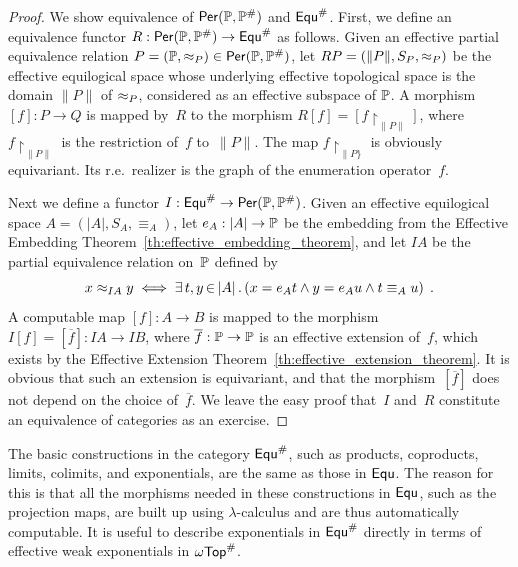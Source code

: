 \begin{proof}
  We show equivalence of $\mathsf{Per}(\mathbb{P}, \mathbb{P}^{\#})$ and
  $\mathsf{Equ}^{\#}$. First, we define an equivalence functor $R: \mathsf{Per}(\mathbb{P},\mathbb{P}^{\#})
  \to \mathsf{Equ}^{\#}$ as follows. Given an effective partial equivalence
  relation $P = (\mathbb{P}, \approx_P) \in \mathsf{Per}(\mathbb{P},\mathbb{P}^{\#})$, let $R P = (\|P\|,
  S_P, \approx_P)$ be the effective equilogical space whose underlying
  effective topological space is the domain $\|P\|$ of $\approx_P$,
  considered as an effective subspace of $\mathbb{P}$. A morphism $[f]: P
  \to Q$ is mapped by~$R$ to the morphism $R[f] =
  [f\restriction_{\|P\|}]$, where $f\restriction_{\|P\|}$ is the
  restriction of~$f$ to~$\|P\|$. The map $f\restriction_{\|P\}}$ is
  obviously equivariant. Its r.e.~realizer is the graph of the
  enumeration operator~$f$.
  
  Next we define a functor $I: \mathsf{Equ}^{\#} \to \mathsf{Per}(\mathbb{P},\mathbb{P}^{\#})$. Given an
  effective equilogical space $A = (|A|, S_A, \equiv_A)$, let $e_A:
  |A| \to \mathbb{P}$ be the embedding from the Effective Embedding
  Theorem~\ref{th:effective_embedding_theorem}, and let $I A$ be the
  partial equivalence relation on~$\mathbb{P}$ defined by
  \begin{equation*}
    x \approx_{I A} y \iff
    \exists\, t,y \,{\in}\, |A|\,.\left(x = e_A t \land y = e_A u \land t \equiv_A u\right) \;.
  \end{equation*}
  A computable map $[f]: A \to B$ is mapped to the morphism $I [f] =
  [\overline{f}]: I A \to I B$, where $\overline{f}: \mathbb{P} \to \mathbb{P}$
  is an effective extension of~$f$, which exists by the Effective
  Extension Theorem~\ref{th:effective_extension_theorem}. It is
  obvious that such an extension is equivariant, and that the
  morphism~$[\overline{f}]$ does not depend on the choice
  of~$\overline{f}$.  We leave the easy proof that~$I$ and~$R$
  constitute an equivalence of categories as an exercise.
\end{proof}

The basic constructions in the category $\mathsf{Equ}^{\#}$, such as products,
coproducts, limits, colimits, and exponentials, are the same as those
in $\mathsf{Equ}$. The reason for this is that all the morphisms needed in
these constructions in $\mathsf{Equ}$, such as the projection maps, are built
up using $\lambda$-calculus and are thus automatically computable. It
is useful to describe exponentials in $\mathsf{Equ}^{\#}$ directly in terms of
effective weak exponentials in $\mathsf{\omega Top}^{\#}$.

